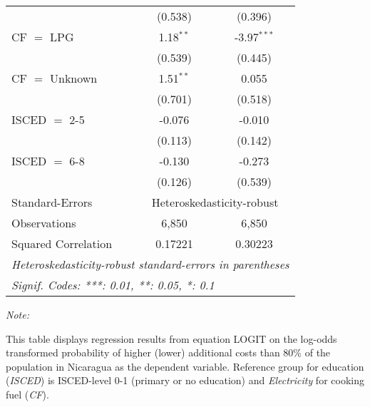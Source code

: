 \begin{table}[htbp!]
\begin{adjustbox}{width = 1\textwidth, max height = 0.95\textheight, center}
\begin{threeparttable}[b]
\begin{tabular}{lcc}
                                 & (0.538)        & (0.396)\\   
            CF $=$ LPG           & 1.18$^{**}$    & -3.97$^{***}$\\   
                                 & (0.539)        & (0.445)\\   
            CF $=$ Unknown       & 1.51$^{**}$    & 0.055\\   
                                 & (0.701)        & (0.518)\\   
            ISCED $=$ 2-5        & -0.076         & -0.010\\   
                                 & (0.113)        & (0.142)\\   
            ISCED $=$ 6-8        & -0.130         & -0.273\\   
                                 & (0.126)        & (0.539)\\   
            \midrule 
            Standard-Errors & \multicolumn{2}{c}{Heteroskedasticity-robust} \\ 
            Observations         & 6,850          & 6,850\\  
            Squared Correlation  & 0.17221        & 0.30223\\  
            \midrule \midrule
            \multicolumn{3}{l}{\emph{Heteroskedasticity-robust standard-errors in parentheses}}\\
            \multicolumn{3}{l}{\emph{Signif. Codes: ***: 0.01, **: 0.05, *: 0.1}}\\
         \end{tabular}
         
         \begin{tablenotes}\item \medskip \textit{Note:}
            \item This table displays regression results from equation LOGIT on the log-odds transformed probability of higher (lower) additional costs than 80\% of the population in Nicaragua as the dependent variable. Reference group for education (\textit{ISCED}) is ISCED-level 0-1 (primary or no education) and \textit{Electricity} for cooking fuel (\textit{CF}).
         \end{tablenotes}
      \end{threeparttable}
   \end{adjustbox}
\end{table}


